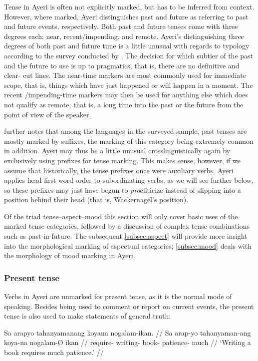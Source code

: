 Tense in Ayeri is often not explicitly marked, but has to be inferred from
context. However, where marked, Ayeri distinguishes past and future as
referring to past and future events, respectively. Both past and future tenses
come with three degrees each: near, recent/impending, and remote. Ayeri's
distinguishing three degrees of both past and future time is a little unusual
with regards to typology according to the survey conducted by
\citet[127]{dahl1985}. The decision for which subtier of the past and the
future to use is up to pragmatics, that is, there are no definitive and clear-
cut lines. The near-time markers are most commonly used for immediate scope,
that is, things which have just happened or will happen in a moment. The recent
/impending-time markers may then be used for anything else which does not
qualify as remote, that is, a long time into the past or the future from the
point of view of the speaker.

\citet[117]{dahl1985} further notes that among the languages in the surveyed
sample, past tenses are mostly marked by suffixes, the marking of this category
being extremely common in addition. Ayeri may thus be a little unusual
crosslinguistically again by exclusively using prefixes for tense marking. This
makes sense, however, if we assume that historically, the tense prefixes once
were auxiliary verbs. Ayeri applies head-first word order to subordinating
verbs, as we will see further below, so these prefixes may just have begun to
\emph{pro}cliticize instead of slipping into a position behind their head (that
is, Wackernagel's position).

Of the triad tense--aspect--mood this section will only cover basic uses of 
the marked tense categories, followed by a discussion of complex tense 
combinations such as past-in-future. The subsequent \autoref{subsec:aspect} 
will provide more insight into the morphological marking of aspectual 
categories; \autoref{subsec:mood} deals with the morphology of mood marking in 
Ayeri.

\subsubsection{Present tense}
Verbs in Ayeri are unmarked for present tense, as it is the normal mode of 
speaking. Besides being used to comment or report on current events, the 
present tense is also used to make statements of general truth:

\ex\begingl
	\gla Sa arapyo tahanyamanang koyana nogalam-ikan. //
	\glb Sa arap-yo tahanyaman-ang koya-na {nogalam-Ø ikan} //
	\glc \PatT{} require-\TsgN{} writing-\Aarg{} book-\Gen{} 
		{patience-\Top{} much} //
	\glft `Writing a book requires much patience.' //
\endgl\xe

